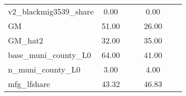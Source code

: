 \begin{table}[htbp]
\begin{tabular}{l*{2}{ccc}}
v2\_blackmig3539\_share&        0.00&            &            &        0.00&            &            \\
GM                  &       51.00&            &            &       26.00&            &            \\
GM\_hat2             &       32.00&            &            &       35.00&            &            \\
base\_muni\_county\_L0 &       64.00&            &            &       41.00&            &            \\
n\_muni\_county\_L0    &        3.00&            &            &        4.00&            &            \\
mfg\_lfshare         &       43.32&            &            &       46.83&            &            \\
\bottomrule
\end{tabular}
\end{table}
